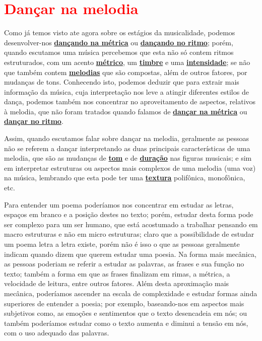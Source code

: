 

\newpage
\section{\textcolor{red}{Dançar na melodia}}
\label{subsec:dancamelodia}

Como já temos visto ate agora sobre os estágios da musicalidade, 
 podemos desenvolver-nos  \hyperref[subsec:dancametrica]{\textbf{dançando na métrica}}  
ou \hyperref[subsec:dancaritmo]{\textbf{dançando no ritmo}};
porém, quando escutamos uma música percebemos que esta não só contem ritmos estruturados, 
com um acento \hyperref[def:Metrica]{\textbf{métrico}}, um \hyperref[sec:pos:timbre]{\textbf{timbre}} 
e uma \hyperref[sec:pos:Intensidade]{\textbf{intensidade}};
se não que também contem \hyperref[sec:pos:Melodia]{\textbf{melodias}} que são compostas, além de outros fatores, 
por mudanças de tons.
Conhecendo isto, 
podemos deduzir que para extrair mais informação da música,
cuja interpretação nos leve a atingir diferentes estilos de dança,
podemos também nos concentrar no aproveitamento de aspectos, relativos à melodia, que não foram tratados 
quando falamos de \hyperref[subsec:dancametrica]{\textbf{dançar na métrica}} ou 
\hyperref[subsec:dancaritmo]{\textbf{dançar no ritmo}}.


Assim, quando escutamos falar sobre dançar na melodia,
geralmente as pessoas não se referem a dançar interpretando as duas principais características de uma melodia,
que são as mudanças de \hyperref[sec:pos:Altura]{\textbf{tom}} e de
\hyperref[sec:pos:Duracion]{\textbf{duração}} nas figuras musicais;
e sim em interpretar estruturas ou aspectos mais complexos de uma melodia (uma voz) na música,
lembrando que esta pode ter uma \hyperref[sec:texturasmusica]{\textbf{textura}} polifônica, monofônica, etc. 


\begin{example}
Para entender um poema poderíamos nos concentrar em estudar as letras, 
espaços em branco  e a posição destes no texto;
porém, estudar desta forma pode ser complexo para um ser humano,
que está acostumado a trabalhar pensando em macro estruturas e não em micro estruturas;
claro que a possibilidade de estudar um poema letra a letra existe,
porém não é isso o que as pessoas geralmente indicam quando dizem que querem estudar uma poesia.
Na forma mais mecânica, 
as pessoas poderiam se referir a estudar as palavras, as frases e sua função no texto;
também a forma em que as frases finalizam em rimas, a métrica,
a velocidade de leitura, entre outros fatores.
Além desta aproximação mais mecânica, 
poderíamos ascender na escala de complexidade e estudar formas ainda superiores de entender a poesia;
por exemplo, baseando-nos em aspectos mais subjetivos como, 
as emoções e sentimentos  que o texto desencadeia em nós;
ou também poderíamos estudar como o texto aumenta e diminui a tensão em nós,
 com o uso adequado das palavras.
\end{example}

